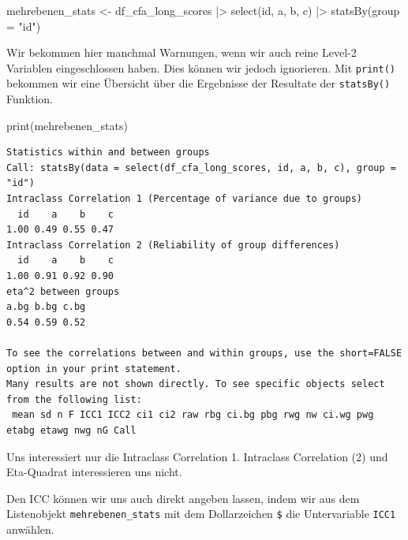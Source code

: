 \documentclass[
  letterpaper,
  DIV=11,
  numbers=noendperiod]{scrreprt}
\newenvironment{Shaded}{\begin{snugshade}}{\end{snugshade}}
\newcommand{\AttributeTok}[1]{\textcolor[rgb]{0.40,0.45,0.13}{#1}}
\newcommand{\CommentTok}[1]{\textcolor[rgb]{0.37,0.37,0.37}{#1}}
\newcommand{\DecValTok}[1]{\textcolor[rgb]{0.68,0.00,0.00}{#1}}
\newcommand{\FunctionTok}[1]{\textcolor[rgb]{0.28,0.35,0.67}{#1}}
\newcommand{\NormalTok}[1]{\textcolor[rgb]{0.00,0.23,0.31}{#1}}
\newcommand{\OtherTok}[1]{\textcolor[rgb]{0.00,0.23,0.31}{#1}}
\newcommand{\SpecialCharTok}[1]{\textcolor[rgb]{0.37,0.37,0.37}{#1}}
\newcommand{\StringTok}[1]{\textcolor[rgb]{0.13,0.47,0.30}{#1}}
\begin{document}
\begin{Shaded}
\begin{Highlighting}[]
\NormalTok{mehrebenen\_stats }\OtherTok{\textless{}{-}}\NormalTok{ df\_cfa\_long\_scores }\SpecialCharTok{|\textgreater{}} 
  \FunctionTok{select}\NormalTok{(id, a, b, c) }\SpecialCharTok{|\textgreater{}} 
    \FunctionTok{statsBy}\NormalTok{(}\AttributeTok{group =} \StringTok{"id"}\NormalTok{)}
\end{Highlighting}
\end{Shaded}

Wir bekommen hier manchmal Warnungen, wenn wir auch reine Level-2
Variablen eingeschlossen haben. Dies können wir jedoch ignorieren. Mit
\texttt{print()} bekommen wir eine Übersicht über die Ergebnisse der
Resultate der \texttt{statsBy()} Funktion.

\begin{Shaded}
\begin{Highlighting}[]
\FunctionTok{print}\NormalTok{(mehrebenen\_stats)}
\end{Highlighting}
\end{Shaded}

\begin{verbatim}
Statistics within and between groups  
Call: statsBy(data = select(df_cfa_long_scores, id, a, b, c), group = "id")
Intraclass Correlation 1 (Percentage of variance due to groups) 
  id    a    b    c 
1.00 0.49 0.55 0.47 
Intraclass Correlation 2 (Reliability of group differences) 
  id    a    b    c 
1.00 0.91 0.92 0.90 
eta^2 between groups  
a.bg b.bg c.bg 
0.54 0.59 0.52 

To see the correlations between and within groups, use the short=FALSE option in your print statement.
Many results are not shown directly. To see specific objects select from the following list:
 mean sd n F ICC1 ICC2 ci1 ci2 raw rbg ci.bg pbg rwg nw ci.wg pwg etabg etawg nwg nG Call
\end{verbatim}

Uns interessiert nur die Intraclass Correlation 1. Intraclass
Correlation (2) und Eta-Quadrat interessieren uns nicht.

Den ICC können wir uns auch direkt angeben lassen, indem wir aus dem
Listenobjekt \texttt{mehrebenen\_stats} mit dem Dollarzeichen
\texttt{\$} die Untervariable \texttt{ICC1} anwählen.

\begin{Shaded}
\end{Shaded}
\end{document}
